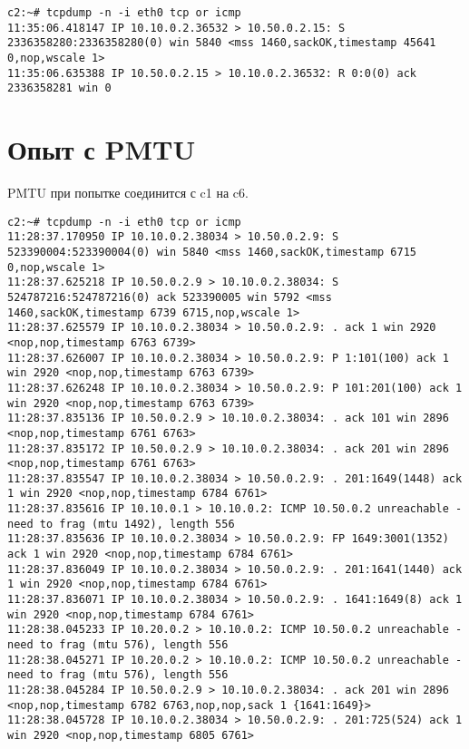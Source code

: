 \documentclass[a4paper,12pt]{article}
\begin{document}
\begin{Verbatim}
c2:~# tcpdump -n -i eth0 tcp or icmp
11:35:06.418147 IP 10.10.0.2.36532 > 10.50.0.2.15: S 2336358280:2336358280(0) win 5840 <mss 1460,sackOK,timestamp 45641 0,nop,wscale 1>
11:35:06.635388 IP 10.50.0.2.15 > 10.10.0.2.36532: R 0:0(0) ack 2336358281 win 0
\end{Verbatim}

\section{Опыт с PMTU}

PMTU при попытке соединится с c1 на c6.

\begin{Verbatim}
c2:~# tcpdump -n -i eth0 tcp or icmp
11:28:37.170950 IP 10.10.0.2.38034 > 10.50.0.2.9: S 523390004:523390004(0) win 5840 <mss 1460,sackOK,timestamp 6715 0,nop,wscale 1>
11:28:37.625218 IP 10.50.0.2.9 > 10.10.0.2.38034: S 524787216:524787216(0) ack 523390005 win 5792 <mss 1460,sackOK,timestamp 6739 6715,nop,wscale 1>
11:28:37.625579 IP 10.10.0.2.38034 > 10.50.0.2.9: . ack 1 win 2920 <nop,nop,timestamp 6763 6739>
11:28:37.626007 IP 10.10.0.2.38034 > 10.50.0.2.9: P 1:101(100) ack 1 win 2920 <nop,nop,timestamp 6763 6739>
11:28:37.626248 IP 10.10.0.2.38034 > 10.50.0.2.9: P 101:201(100) ack 1 win 2920 <nop,nop,timestamp 6763 6739>
11:28:37.835136 IP 10.50.0.2.9 > 10.10.0.2.38034: . ack 101 win 2896 <nop,nop,timestamp 6761 6763>
11:28:37.835172 IP 10.50.0.2.9 > 10.10.0.2.38034: . ack 201 win 2896 <nop,nop,timestamp 6761 6763>
11:28:37.835547 IP 10.10.0.2.38034 > 10.50.0.2.9: . 201:1649(1448) ack 1 win 2920 <nop,nop,timestamp 6784 6761>
11:28:37.835616 IP 10.10.0.1 > 10.10.0.2: ICMP 10.50.0.2 unreachable - need to frag (mtu 1492), length 556
11:28:37.835636 IP 10.10.0.2.38034 > 10.50.0.2.9: FP 1649:3001(1352) ack 1 win 2920 <nop,nop,timestamp 6784 6761>
11:28:37.836049 IP 10.10.0.2.38034 > 10.50.0.2.9: . 201:1641(1440) ack 1 win 2920 <nop,nop,timestamp 6784 6761>
11:28:37.836071 IP 10.10.0.2.38034 > 10.50.0.2.9: . 1641:1649(8) ack 1 win 2920 <nop,nop,timestamp 6784 6761>
11:28:38.045233 IP 10.20.0.2 > 10.10.0.2: ICMP 10.50.0.2 unreachable - need to frag (mtu 576), length 556
11:28:38.045271 IP 10.20.0.2 > 10.10.0.2: ICMP 10.50.0.2 unreachable - need to frag (mtu 576), length 556
11:28:38.045284 IP 10.50.0.2.9 > 10.10.0.2.38034: . ack 201 win 2896 <nop,nop,timestamp 6782 6763,nop,nop,sack 1 {1641:1649}>
11:28:38.045728 IP 10.10.0.2.38034 > 10.50.0.2.9: . 201:725(524) ack 1 win 2920 <nop,nop,timestamp 6805 6761>

\end{Verbatim}
\end{document}
